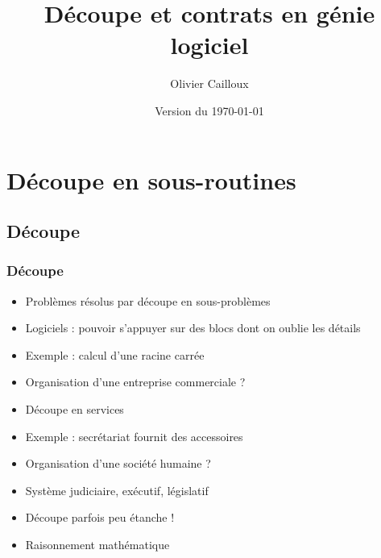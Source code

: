 \documentclass[english, french]{beamer}
\title{Découpe et contrats en génie logiciel}
\subtitle{}
\author{Olivier Cailloux}
\institute[LAMSADE]{LAMSADE, Université Paris-Dauphine}
\date{Version du \today}
\begin{document}


\begin{frame}[plain]
   \titlepage
\end{frame}
\addtocounter{framenumber}{-1}

\section{Découpe en sous-routines}
\subsection{Découpe}
\begin{frame}
	\frametitle{Découpe}
	\begin{itemize}
		\item Problèmes résolus par découpe en sous-problèmes
		\item Logiciels : pouvoir s’appuyer sur des blocs dont on oublie les détails
		\item Exemple : calcul d’une racine carrée
		\item Organisation d’une entreprise commerciale ?
		\item<2-> Découpe en services
		\item<2-> Exemple : secrétariat fournit des accessoires
		\item Organisation d’une société humaine ?
		\item<3-> Système judiciaire, exécutif, législatif
		\item Découpe parfois peu étanche !
		\item Raisonnement mathématique
	\end{itemize}
\end{frame}
\end{document}
